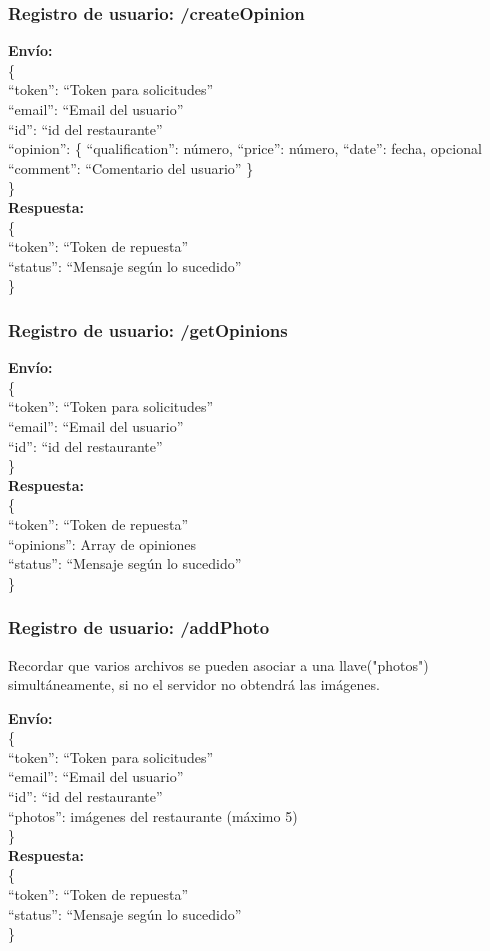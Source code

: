 \documentclass[12pt,letterpaper]{article}
\begin{document}
\subsubsection{Registro de usuario: /createOpinion}
\noindent
\textbf{Envío: }\\
\noindent
\{ \\
``token'': ``Token para solicitudes'' \\
``email'': ``Email del usuario'' \\
``id'': ``id del restaurante''\\
``opinion'': \{ ``qualification'': número, ``price'': número, ``date'': fecha, opcional ``comment'': ``Comentario del usuario'' \} \\
\} \\ 
\noindent
\textbf{Respuesta: }\\
\noindent
\{ \\
``token'': ``Token de repuesta'' \\
``status'': ``Mensaje según lo sucedido'' \\
\}

\subsubsection{Registro de usuario: /getOpinions}
\noindent
\textbf{Envío: }\\
\noindent
\{ \\
``token'': ``Token para solicitudes'' \\
``email'': ``Email del usuario'' \\
``id'': ``id del restaurante''\\
\} \\ 
\noindent
\textbf{Respuesta: }\\
\noindent
\{ \\
``token'': ``Token de repuesta'' \\
``opinions'': Array de opiniones\\
``status'': ``Mensaje según lo sucedido'' \\
\}

\subsubsection{Registro de usuario: /addPhoto}
Recordar que varios archivos se pueden asociar a una llave("photos") simultáneamente, si no el servidor no obtendrá las imágenes.

\noindent
\textbf{Envío: }\\
\noindent
\{ \\
``token'': ``Token para solicitudes'' \\
``email'': ``Email del usuario'' \\
``id'': ``id del restaurante''\\
``photos'': imágenes del restaurante (máximo 5)\\
\} \\ 
\noindent
\textbf{Respuesta: }\\
\noindent
\{ \\
``token'': ``Token de repuesta'' \\
``status'': ``Mensaje según lo sucedido'' \\
\}
\end{document}
